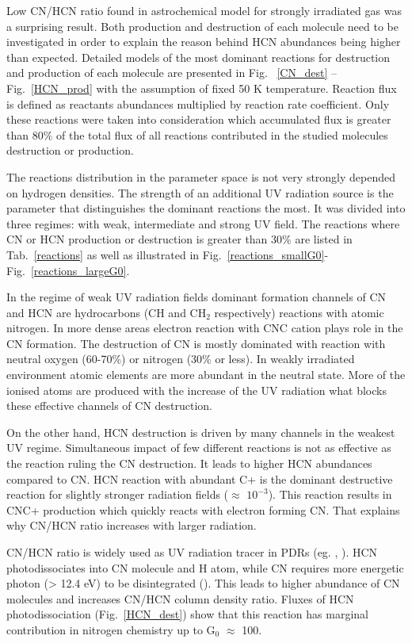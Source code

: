 \documentclass{aa}
\begin{document}
Low CN/HCN ratio found in astrochemical model for strongly irradiated gas was a surprising result. Both production and destruction of each molecule need to be investigated in order to explain the reason behind HCN abundances being higher than expected. Detailed models of the most dominant reactions for destruction and production of each molecule are presented in Fig. ~\ref{CN_dest} – Fig.~\ref{HCN_prod} with the assumption of fixed 50 K temperature. Reaction flux is defined as reactants abundances multiplied by reaction rate coefficient. Only these reactions were taken into consideration which accumulated flux is greater than 80$\%$ of the total flux of all reactions contributed in the studied molecules destruction or production. 

The reactions distribution in the parameter space is not very strongly depended on hydrogen densities. The strength of an additional UV radiation source is the parameter that distinguishes the dominant reactions the most. It was divided into three regimes: with weak, intermediate and strong UV field. The reactions where CN or HCN production or destruction is greater than 30$\%$ are listed in Tab.~\ref{reactions} as well as illustrated in Fig.~\ref{reactions_smallG0}- Fig.~\ref{reactions_largeG0}.

In the regime of weak UV radiation fields dominant formation channels of CN and HCN are hydrocarbons (CH and CH$_2$ respectively) reactions with atomic nitrogen. In more dense areas electron reaction with CNC cation plays role in the CN formation. The destruction of CN is mostly dominated with reaction with neutral oxygen (60-70$\%$) or nitrogen (30$\%$ or less). In weakly irradiated environment atomic elements are more abundant in the neutral state. More of the ionised atoms are produced with the increase of the UV radiation what blocks these effective channels of CN destruction. 

On the other hand, HCN destruction is driven by many channels in the weakest UV regime. Simultaneous impact of few different reactions is not as effective as the reaction ruling the CN destruction. It leads to higher HCN abundances compared to CN. HCN reaction with abundant C+ is the dominant destructive reaction for slightly stronger radiation fields ($\approx$ $10^{-3}$). This reaction results in CNC+ production which quickly reacts with electron forming CN. That explains why CN/HCN ratio increases with larger radiation. 

CN/HCN ratio is widely used as UV radiation tracer in PDRs (eg. \citealt{Thi04}, \citealt{Han15}). HCN photodissociates into CN molecule and H atom, while CN requires more energetic photon (> 12.4 eV) to be disintegrated (\citealt{vDi87}). This leads to higher abundance of CN molecules and increases CN/HCN column density ratio. Fluxes of HCN photodissociation (Fig.~\ref{HCN_dest}) show that this reaction has marginal contribution in nitrogen chemistry up to G$_0$ $\approx$ 100.
\end{document}
